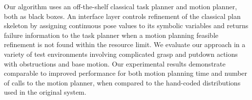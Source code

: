 Our algorithm uses an off-the-shelf classical task planner and motion planner, both as black
boxes. An interface layer controls refinement of the classical plan skeleton by assigning continuous pose
values to its symbolic variables and returns failure information to the task planner
when a motion planning feasible refinement is not found within the resource limit. We evaluate
our approach in a variety of test environments involving complicated grasp and putdown
actions with obstructions and base motion. Our experimental results demonstrate
comparable to improved performance for both motion planning time and number of calls to
the motion planner, when compared to the hand-coded distributions used in the original system.